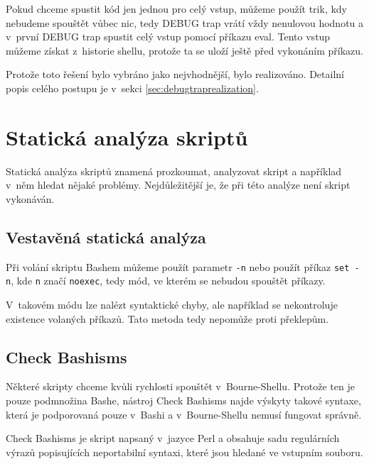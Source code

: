 \documentclass[thesis=M,czech]{FITthesis}[2012/06/26]
\begin{document}
Pokud chceme spustit kód jen jednou pro celý vstup, můžeme použít trik, kdy nebudeme spouštět vůbec nic, tedy DEBUG trap vrátí vždy nenulovou hodnotu a v~první DEBUG trap spustit celý vstup pomocí příkazu eval. Tento vstup můžeme získat z~historie shellu, protože ta se uloží ještě před vykonáním příkazu.

Protože toto řešení bylo vybráno jako nejvhodnější, bylo realizováno. Detailní popis celého postupu je v~sekci \ref{sec:debugtraprealization}.




\section{Statická analýza skriptů}

Statická analýza skriptů znamená prozkoumat, analyzovat skript a například v~něm hledat nějaké problémy. Nejdůležitější je, že při této analýze není skript vykonáván.


%
%
\subsection{Vestavěná statická analýza}

Při volání skriptu Bashem můžeme použít parametr \texttt{-n} nebo použít příkaz \texttt{set -n}, kde \texttt{n} značí \texttt{noexec}, tedy mód, ve kterém se nebudou spouštět příkazy.

V~takovém módu lze nalézt syntaktické chyby, ale například se nekontroluje existence volaných příkazů. Tato metoda  tedy nepomůže proti překlepům.


%
%
\subsection{Check Bashisms}

Některé skripty chceme kvůli rychlosti spouštět v~Bourne-Shellu. Protože ten je pouze podmnožina Bashe, nástroj Check Bashisms \cite{checkbaskisms} najde výskyty takové syntaxe, která je podporovaná pouze v~Bashi a v~Bourne-Shellu nemusí fungovat správně.

Check Bashisms je skript napsaný v~jazyce Perl \cite{perl} a obsahuje sadu regulárních výrazů popisujících neportabilní syntaxi, které jsou hledané ve vstupním souboru.


\end{document}

